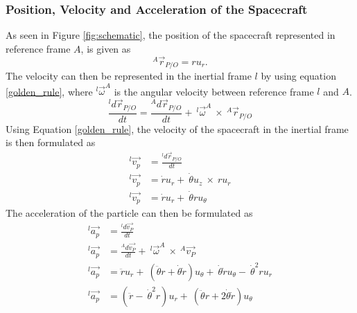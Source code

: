 \documentclass[]{article}
\begin{document}
	\subsubsection{Position, Velocity and Acceleration of the Spacecraft}
	As seen in Figure \ref{fig:schematic}, the position of the spacecraft represented in reference frame \(A\), is given as 
	\begin{equation} \label{position}
		^A\vec{r}_{P/O} = ru_{r}.
	\end{equation}
	The velocity can then be represented in the inertial frame \(l\) by using equation \ref{golden_rule}, where \(^l\vec{\omega}^A\) is the angular velocity between reference frame \(l\) and \(A\).
	\begin{equation} \label{golden_rule}
		\frac{^ld\vec{r}_{P/O}}{dt} = \frac{^Ad\vec{r}_{P/O}}{dt} +\ ^l\vec{\omega}^A\  \times\  ^A\vec{r}_{P/O} 
	\end{equation}
	Using Equation \ref{golden_rule}, the velocity of the spacecraft in the inertial frame is then formulated as
	\begin{align}
		^l\vec{v_{p}} &= \frac{^ld\vec{r}_{P/O}}{dt} \nonumber\\
		^l\vec{v_{p}} &= \dot{r}u_{r} +\ \dot{\theta}u_{z}\ \times\ ru_{r} \nonumber\\
		^l\vec{v_{p}} &= \dot{r}u_{r} +\ \dot{\theta}ru_{\theta} \label{velocity}
	\end{align}
	The acceleration of the particle can then be formulated as 
	\begin{align}
		^l\vec{a_{p}} &= \frac{^ld\vec{v_{P}}}{dt} \nonumber\\
		^l\vec{a_{p}} &= \frac{^Ad\vec{v_{P}}}{dt} +\ ^l\vec{\omega}^A\  \times\  ^A\vec{v_{P}} \nonumber\\
		^l\vec{a_{p}} &= \ddot{r}u_{r} +\ (\ddot{\theta}r+\dot{\theta}\dot{r})u_{\theta} +\ \dot{\theta}\dot{r}u_{\theta} -\ \dot{\theta}^2ru_{r} \nonumber\\
		^l\vec{a_{p}} &= (\ddot{r} -\ \dot{\theta}^2r)u_{r} +\ (\ddot{\theta}r+2\dot{\theta}\dot{r})u_{\theta}   \label{acceleration}
	\end{align}
	
\end{document}
